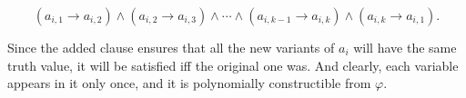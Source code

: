 \documentclass[11pt]{article} \usepackage{amssymb}
\renewcommand{\phi}{\varphi}
\begin{document}
\begin{enumerate}
    \begin{equation*}
    (a_{i,1}\to a_{i,2})\wedge(a_{i,2}\to a_{i,3})\wedge\cdots\wedge
(a_{i,k-1}\to a_{i,k})\wedge(a_{i,k}\to a_{i,1}).
    \end{equation*}

    Since the added clause ensures that all the new variants of $a_i$ will have
    the same truth value, it will be satisfied iff the original one was. And
    clearly, each variable appears in it only once, and it is polynomially
    constructible from $\phi$.

    

\end{enumerate}
\end{document}
